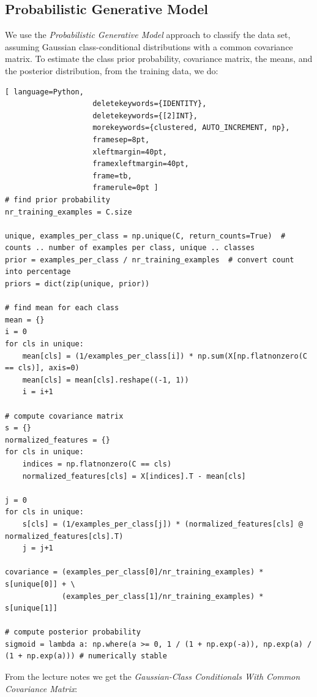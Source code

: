 \documentclass[a4paper,11pt,oneside]{article}
\begin{document}
\subsection{Probabilistic Generative Model}

We use the \textit{Probabilistic Generative Model} approach to classify the data set, assuming Gaussian class-conditional distributions with a common covariance matrix. To estimate the class prior probability, covariance matrix, the means, and the posterior distribution, from the training data, we do:
	\begin{lstlisting}[ language=Python,
                    deletekeywords={IDENTITY},
                    deletekeywords={[2]INT},
                    morekeywords={clustered, AUTO_INCREMENT, np},
                    framesep=8pt,
                    xleftmargin=40pt,
                    framexleftmargin=40pt,
                    frame=tb,
                    framerule=0pt ]
# find prior probability
nr_training_examples = C.size

unique, examples_per_class = np.unique(C, return_counts=True)  # counts .. number of examples per class, unique .. classes
prior = examples_per_class / nr_training_examples  # convert count into percentage
priors = dict(zip(unique, prior))

# find mean for each class
mean = {}
i = 0
for cls in unique:
    mean[cls] = (1/examples_per_class[i]) * np.sum(X[np.flatnonzero(C == cls)], axis=0)
    mean[cls] = mean[cls].reshape((-1, 1))
    i = i+1

# compute covariance matrix
s = {}
normalized_features = {}
for cls in unique:
    indices = np.flatnonzero(C == cls)
    normalized_features[cls] = X[indices].T - mean[cls]

j = 0
for cls in unique:
    s[cls] = (1/examples_per_class[j]) * (normalized_features[cls] @ normalized_features[cls].T)
    j = j+1

covariance = (examples_per_class[0]/nr_training_examples) * s[unique[0]] + \
             (examples_per_class[1]/nr_training_examples) * s[unique[1]]

# compute posterior probability
sigmoid = lambda a: np.where(a >= 0, 1 / (1 + np.exp(-a)), np.exp(a) / (1 + np.exp(a))) # numerically stable
\end{lstlisting}

From the lecture notes we get the \textit{Gaussian-Class Conditionals With Common Covariance Matrix}:
\end{document}
